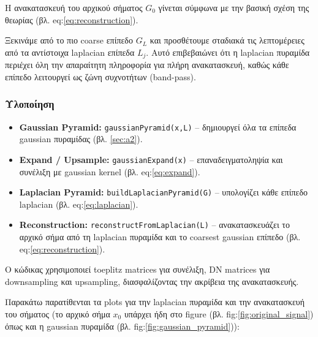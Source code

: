 \documentclass[12pt]{article}
\begin{document}
Η ανακατασκευή του αρχικού σήματος $G_0$ γίνεται σύμφωνα με την βασική σχέση της θεωρίας (βλ. eq:\ref{eq:reconstruction}).  

Ξεκινάμε από το πιο coarse επίπεδο $G_L$ και προσθέτουμε σταδιακά τις λεπτομέρειες από τα αντίστοιχα laplacian επίπεδα $L_j$.  
Αυτό επιβεβαιώνει ότι η laplacian πυραμίδα περιέχει όλη την απαραίτητη πληροφορία για πλήρη ανακατασκευή, καθώς κάθε επίπεδο λειτουργεί ως ζώνη συχνοτήτων (band-pass).

\subsubsection{Υλοποίηση}

\begin{itemize}
    \item \textbf{Gaussian Pyramid:} \texttt{gaussianPyramid(x,L)} – δημιουργεί όλα τα επίπεδα gaussian πυραμίδας (βλ. \ref{sec:a2}).
    \item \textbf{Expand / Upsample:} \texttt{gaussianExpand(x)} – επαναδειγματοληψία και συνέλιξη με gaussian kernel (βλ. eq:\ref{eq:expand}).
    \item \textbf{Laplacian Pyramid:} \texttt{buildLaplacianPyramid(G)} – υπολογίζει κάθε επίπεδο laplacian (βλ. eq:\ref{eq:laplacian}).
    \item \textbf{Reconstruction:} \texttt{reconstructFromLaplacian(L)} – ανακατασκευάζει το αρχικό σήμα από τη laplacian πυραμίδα και το coarsest gaussian επίπεδο (βλ. eq:\ref{eq:reconstruction}).
\end{itemize}

Ο κώδικας χρησιμοποιεί toeplitz matrices για συνέλιξη, DN matrices για downsampling και upsampling, διασφαλίζοντας την ακρίβεια της ανακατασκευής.

\bigskip
\noindent
Παρακάτω παρατίθενται τα plots για την laplacian πυραμίδα και την ανακατασκευή του σήματος (το αρχικό σήμα $x_0$ υπάρχει ήδη στο figure (βλ. fig:\ref{fig:original_signal}) όπως και η gaussian πυραμίδα (βλ. fig:\ref{fig:gaussian_pyramid})):
\end{document}
